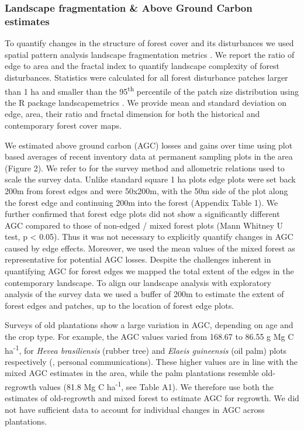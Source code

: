 \documentclass[remote sensing,article,submit,moreauthors,pdftex,10pt,a4paper]{mdpi}
\begin{document}
\hypertarget{landscape-fragmentation-above-ground-carbon-estimates}{%
\subsubsection{Landscape fragmentation \& Above Ground Carbon
estimates}\label{landscape-fragmentation-above-ground-carbon-estimates}}

To quantify changes in the structure of forest cover and its
disturbances we used spatial pattern analysis landscape fragmentation
metrics \citep{dale1999}. We report the ratio of edge to area and the
fractal index to quantify landscape complexity of forest disturbances.
Statistics were calculated for all forest disturbance patches larger
than 1 ha and smaller than the 95\textsuperscript{th} percentile of the
patch size distribution using the R package landscapemetrics
\citep{hesselbarth2019}. We provide mean and standard deviation on edge,
area, their ratio and fractal dimension for both the historical and
contemporary \citet{hansen2013} forest cover maps.

We estimated above ground carbon (AGC) losses and gains over time using
plot based averages of recent inventory data at permanent sampling plots
in the area (Figure 2). We refer to \citet{Kearsley2013} for the survey
method and allometric relations used to scale the survey data. Unlike
standard square 1 ha plots edge plots were set back 200m from forest
edges and were 50x200m, with the 50m side of the plot along the forest
edge and continuing 200m into the forest (Appendix Table 1). We further
confirmed that forest edge plots did not show a significantly different
AGC compared to those of non-edged / mixed forest plots (Mann Whitney U
test, p \textless{} 0.05). Thus it was not necessary to explicitly
quantify changes in AGC caused by edge effects. Moreover, we used the
mean values of the mixed forest as representative for potential AGC
losses. Despite the challenges inherent in quantifying AGC for forest
edges we mapped the total extent of the edges in the contemporary
landscape. To align our landscape analysis with exploratory analysis of
the survey data we used a buffer of 200m to estimate the extent of
forest edges and patches, up to the location of forest edge plots.

Surveys of old plantations show a large variation in AGC, depending on
age and the crop type. For example, the AGC values varied from 168.67 to
86.55 g Mg C ha\textsuperscript{-1}, for \emph{Hevea brasiliensis}
(rubber tree) and \emph{Elaeis guineensis} (oil palm) plots respectively
(\citet{bustillo2018}, personal communications). These higher values are
in line with the mixed AGC estimates in the area, while the palm
plantations resemble old-regrowth values (81.8 Mg C
ha\textsuperscript{-1}, see Table A1). We therefore use both the
estimates of old-regrowth and mixed forest to estimate AGC for regrowth.
We did not have sufficient data to account for individual changes in AGC
across plantations.
\end{document}
